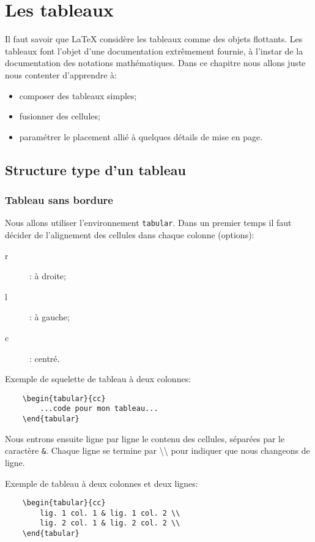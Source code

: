 
\chapter{Les tableaux}
Il faut savoir que \LaTeX{} considère les tableaux comme des objets flottants. Les tableaux font l'objet d'une documentation extrêmement fournie, à l'instar de la documentation des notations mathématiques. Dans ce chapitre nous allons juste nous contenter d'apprendre à:
\begin{itemize}
	\item composer des tableaux simples;
	\item fusionner des cellules;
	\item paramétrer le placement allié à quelques détails de mise en page.
\end{itemize} 
\medskip

\section{Structure type d'un tableau}
\subsection*{Tableau sans bordure}
Nous allons utiliser l'environnement \texttt{tabular}. Dans un premier temps il faut décider de l'alignement des cellules dans chaque colonne (options):
\begin{description}
	\item[r]: à droite;
	\item[l]: à gauche;
	\item[c]: centré.
\end{description}
\medskip

Exemple de squelette de tableau à deux colonnes:
\begin{verbatim}
    \begin{tabular}{cc}
        ...code pour mon tableau...
    \end{tabular}
\end{verbatim}
\medskip

Nous entrons ensuite ligne par ligne le contenu des cellules, séparées par le caractère \texttt{\&}. Chaque ligne se termine par \textbackslash \textbackslash{} pour indiquer que nous changeons de ligne.
\medskip

Exemple de tableau à deux colonnes et deux lignes:
\begin{verbatim}
    \begin{tabular}{cc}
        lig. 1 col. 1 & lig. 1 col. 2 \\
        lig. 2 col. 1 & lig. 2 col. 2 \\
    \end{tabular}
\end{verbatim}
\medskip


